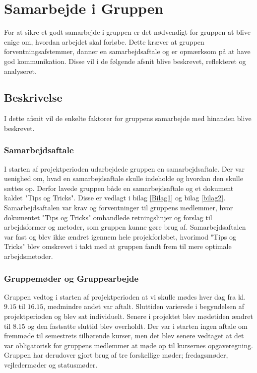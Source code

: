 \chapter{Samarbejde i Gruppen}
For at sikre et godt samarbejde i gruppen er det nødvendigt for gruppen at blive enige om, hvordan arbejdet skal forløbe. Dette kræver at gruppen forventningsafstemmer, danner en samarbejdsaftale og er opmærksom på at have god kommunikation. Disse vil i de følgende afsnit blive beskrevet, reflekteret og analyseret.

\section{Beskrivelse}
I dette afsnit vil de enkelte faktorer for gruppens samarbejde med hinanden blive beskrevet. 

\subsection{Samarbejdsaftale}
I starten af projektperioden udarbejdede gruppen en samarbejdsaftale. Der var uenighed om, hvad en samarbejdsaftale skulle indeholde og hvordan den skulle sættes op. Derfor lavede gruppen både en samarbejdsaftale og et dokument kaldet "Tips og Tricks". Disse er vedlagt i bilag \ref{Bilag1} og bilag \ref{bilag2}. Samarbejdsaftalen var krav og forventninger til gruppens medlemmer, hvor dokumentet "Tips og Tricks" omhandlede retningslinjer og forslag til arbejdsformer og metoder, som gruppen kunne gøre brug af. Samarbejdsaftalen var fast og blev ikke ændret igennem hele projekforløbet, hvorimod "Tips og Tricks" blev omskrevet i takt med at gruppen fandt frem til mere optimale arbejdsmetoder. 

\subsection{Gruppemøder og Gruppearbejde}
Gruppen vedtog i starten af projektperioden at vi skulle mødes hver dag fra kl. $9.15$ til $16.15$, medmindre andet var aftalt. Sluttiden varierede i begyndelsen af projektperioden og blev sat individuelt. Senere i projektet blev mødetiden ændret til $8.15$ og den fastsatte sluttid blev overholdt. Der var i starten ingen aftale om fremmøde til semestrets tilhørende kurser, men det blev senere vedtaget at det var obligatorisk for gruppens medlemmer at møde op til kursernes opgaveregning.
Gruppen har derudover gjort brug af tre forskellige møder; fredagsmøder, vejledermøder og statusmøder.

